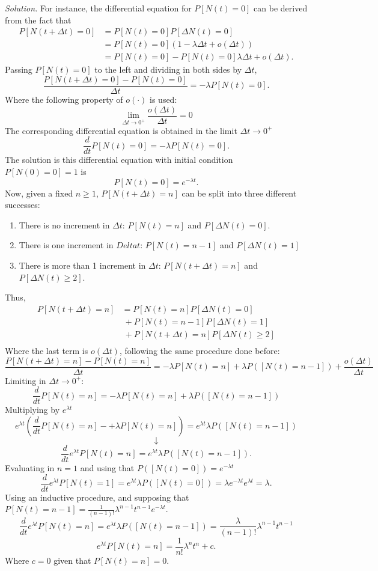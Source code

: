 \emph{Solution. }For instance, the differential equation for \( P[N(t) = 0]\) can be derived from the fact that
\[
  \begin{aligned}
    P[N(t + \Delta t) = 0] &= P[N(t) = 0]P[\Delta N(t) = 0]\\
    &= P[N(t) = 0](1- \lambda\Delta t + o(\Delta t))\\
    &= P[N(t) = 0] - P[N(t) = 0]\lambda\Delta t + o(\Delta t).
    \end{aligned}
  \]
  Passing \( P[N(t) = 0] \) to the left and dividing in both sides by \( \Delta t \),
  \[
    \frac{P[N(t + \Delta t) = 0] - P[N(t) = 0]}{\Delta t} = - \lambda P[N(t) = 0].
  \]
  Where the following property of \( o(\cdot) \) is used:
  \[
    \lim_{\Delta t \to 0^{+}}\frac{o(\Delta t)}{\Delta t} = 0
  \]
The corresponding differential equation is obtained in the limit \( \Delta t \to 0^{+} \)
\[
  \frac{d}{dt}P[N(t) = 0] = -\lambda P[N(t) = 0].
\]
The solution is this differential equation with initial condition \( P[N(0) = 0] = 1 \) is
\[
  P[N(t) = 0] = e^{-\lambda t}.
\]
Now, given a fixed \( n \geq 1 \), \(  P[N(t + \Delta t) = n] \) can be split into three different successes:
\begin{enumerate}
  \item There is no increment in \( \Delta t \): \(  P[N(t) = n] \) and \(P[\Delta N(t) = 0]\).
  \item There is one increment in \( Delta t \): \(P[N(t) = n-1]\) and \(P[\Delta N(t) = 1] \)
\item There is more than 1 increment in \( \Delta t \): \(  P[N(t + \Delta t) = n]\) and \(P[\Delta N(t) \geq 2] \).
\end{enumerate}
Thus,
\[
  \begin{aligned}
    P[N(t + \Delta t) = n] &= P[N(t) = n]P[\Delta N(t) = 0]\\
    &\ + P[N(t) = n-1]P[\Delta N(t) = 1] \\
    &\ + P[N(t + \Delta t) = n]P[\Delta N(t) \geq 2]\\
    \end{aligned}
  \]
  Where the last term is \( o(\Delta t) \), following the same procedure done before:
  \[
    \frac{P[N(t + \Delta t) = n] - P[N(t) = n]}{\Delta t} = -\lambda P[N(t) = n] + \lambda P([N(t) = n-1]) + \frac{o(\Delta t)}{\Delta t}
  \]
  Limiting in \( \Delta t \to 0^{+} \):
  \[
    \frac{d}{dt}P[N(t) = n] =  -\lambda P[N(t) = n] + \lambda P([N(t) = n-1])
  \]
  Multiplying by \( e^{\lambda t} \)
\[
  e^{\lambda t}\left( \frac{d}{dt}P[N(t) = n]- + \lambda P[N(t) = n] \right) = e^{\lambda t}\lambda P([N(t) = n-1])
\]
\[
  \downarrow
\]
\[
  \frac{d}{dt} e^{\lambda t}P[N(t) = n] = e^{\lambda t}\lambda P([N(t) = n-1]).
\]
Evaluating in \( n = 1 \) and using that \(  P([N(t) = 0]) = e^{-\lambda t}  \)
\[
   \frac{d}{dt} e^{\lambda t}P[N(t) = 1] = e^{\lambda t}\lambda P([N(t) = 0]) = \lambda e^{-\lambda t}e^{\lambda t} = \lambda.
 \]
 Using an inductive procedure, and supposing that \( P[N(t) = n-1] = \frac{1}{(n-1)!}\lambda^{n-1}t^{n-1} e^{-\lambda t} \).
 \[
    \frac{d}{dt} e^{\lambda t}P[N(t) = n] = e^{\lambda t}\lambda P([N(t) = n-1]) = \frac{\lambda}{(n-1)!}\lambda^{n-1}t^{n-1}
 \]
\[
  e^{\lambda t}P[N(t) = n] = \frac{1}{n!}\lambda^{n}t^{n} + c.
\]
Where \( c = 0 \) given that \( P[N(t) = n] = 0\).
\newpage

